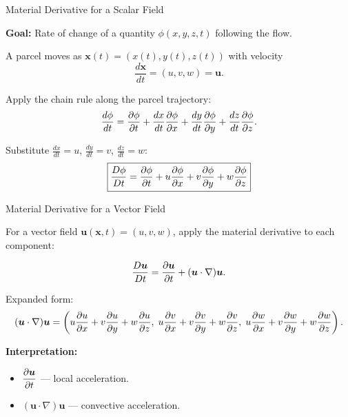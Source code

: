 \documentclass[aspectratio=169]{beamer}
\begin{document}
\begin{frame}{Material Derivative for a Scalar Field}

\textbf{Goal:} Rate of change of a quantity $\phi(x,y,z,t)$ following the flow.

\vspace{0.4cm}

A parcel moves as $\bm{x}(t) = (x(t), y(t), z(t))$ with velocity
\[
\frac{d\bm{x}}{dt} = (u, v, w) = \bm{u}.
\]

Apply the chain rule along the parcel trajectory:
\[
\frac{d\phi}{dt}
= \pdv{\phi}{t}
+ \frac{dx}{dt}\pdv{\phi}{x}
+ \frac{dy}{dt}\pdv{\phi}{y}
+ \frac{dz}{dt}\pdv{\phi}{z}.
\]

\vspace{0.4cm}

Substitute $\frac{dx}{dt}=u$, $\frac{dy}{dt}=v$, $\frac{dz}{dt}=w$:
\[
\boxed{
\frac{D\phi}{Dt}
= \pdv{\phi}{t}
+ u\pdv{\phi}{x}
+ v\pdv{\phi}{y}
+ w\pdv{\phi}{z}
}
\]

\end{frame}

\begin{frame}{Material Derivative for a Vector Field}

For a vector field $\bm{u}(\bm{x},t) = (u,v,w)$,
apply the material derivative to each component:

\[
\frac{D\bm{u}}{Dt}
= \pdv{\bm{u}}{t} + (\bm{u}\cdot\nabla)\bm{u}.
\]

\vspace{0.4cm}

Expanded form:
\[
(\bm{u}\cdot\nabla)\bm{u}
= \left(
u\pdv{u}{x} + v\pdv{u}{y} + w\pdv{u}{z},\;
u\pdv{v}{x} + v\pdv{v}{y} + w\pdv{v}{z},\;
u\pdv{w}{x} + v\pdv{w}{y} + w\pdv{w}{z}
\right).
\]

\vspace{0.4cm}

\textbf{Interpretation:}
\begin{itemize}
  \item $\displaystyle \pdv{\bm{u}}{t}$ — local acceleration.
  \item $\displaystyle (\bm{u}\cdot\nabla)\bm{u}$ — convective acceleration.
\end{itemize}

\end{frame}
\end{document}
